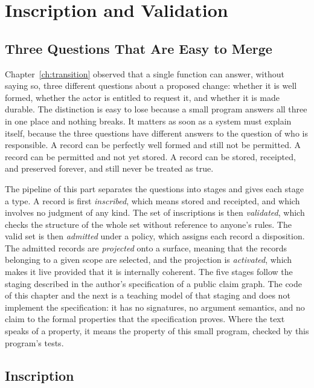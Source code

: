 \chapter{Inscription and Validation}
\label{ch:inscription}

\section{Three Questions That Are Easy to Merge}

Chapter~\ref{ch:transition} observed that a single function can answer, without saying so, three different questions about a proposed change: whether it is well formed, whether the actor is entitled to request it, and whether it is made durable. The distinction is easy to lose because a small program answers all three in one place and nothing breaks. It matters as soon as a system must explain itself, because the three questions have different answers to the question of who is responsible. A record can be perfectly well formed and still not be permitted. A record can be permitted and not yet stored. A record can be stored, receipted, and preserved forever, and still never be treated as true.

The pipeline of this part separates the questions into stages and gives each stage a type. A record is first \emph{inscribed}, which means stored and receipted, and which involves no judgment of any kind. The set of inscriptions is then \emph{validated}, which checks the structure of the whole set without reference to anyone's rules. The valid set is then \emph{admitted} under a policy, which assigns each record a disposition. The admitted records are \emph{projected} onto a surface, meaning that the records belonging to a given scope are selected, and the projection is \emph{activated}, which makes it live provided that it is internally coherent. The five stages follow the staging described in the author's specification of a public claim graph. The code of this chapter and the next is a teaching model of that staging and does not implement the specification: it has no signatures, no argument semantics, and no claim to the formal properties that the specification proves. Where the text speaks of a property, it means the property of this small program, checked by this program's tests.


\section{Inscription}

